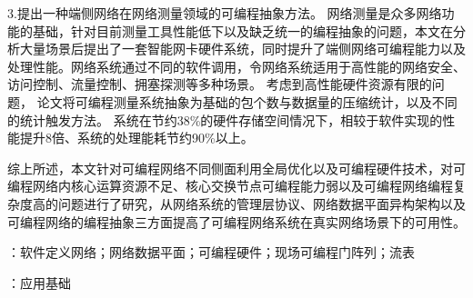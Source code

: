 3.提出一种端侧网络在网络测量领域的可编程抽象方法。
网络测量是众多网络功能的基础，针对目前测量工具性能低下以及缺乏统一的编程抽象的问题，本文在分析大量场景后提出了一套智能网卡硬件系统，同时提升了端侧网络可编程能力以及处理性能。网络系统通过不同的软件调用，令网络系统适用于高性能的网络安全、访问控制、流量控制、拥塞探测等多种场景。
考虑到高性能硬件资源有限的问题，
论文将可编程测量系统抽象为基础的包个数与数据量的压缩统计，以及不同的统计触发方法。
系统在节约38\%的硬件存储空间情况下，相较于软件实现的性能提升8倍、系统的处理能耗节约90\%以上。

综上所述，本文针对可编程网络不同侧面利用全局优化以及可编程硬件技术，对可编程网络内核心运算资源不足、核心交换节点可编程能力弱以及可编程网络编程复杂度高的问题进行了研究，从网络系统的管理层协议、网络数据平面异构架构以及可编程网络的编程抽象三方面提高了可编程网络系统在真实网络场景下的可用性。



{\boldsong}
\vspace{\baselineskip}
：软件定义网络；网络数据平面；可编程硬件；现场可编程门阵列；流表

\vspace{\baselineskip}
：应用基础


\clearpage


